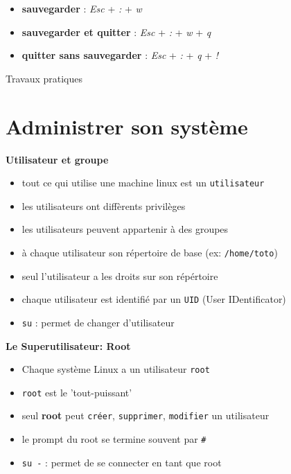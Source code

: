 \documentclass[french]{beamer}
\begin{document}
\begin{frame}
    \begin{itemize}
    \item \textbf{sauvegarder} : \textit{Esc} + \textit{:} + \textit{w} 
    \item \textbf{sauvegarder et quitter} : \textit{Esc} + \textit{:} +
    \textit{w} + \textit{q} 
    \item \textbf{quitter sans sauvegarder} : \textit{Esc} + \textit{:} +
    \textit{q} + \textit{!} 
    \end{itemize}
\end{frame}

\begin{frame}
\begin{center}
Travaux pratiques
\end{center}
\end{frame}

\section{Administrer son système}
\frame{\tableofcontents[current]}


\begin{frame}
\textbf{Utilisateur et groupe}
    \begin{itemize}
    \item tout ce qui utilise une machine linux est un \texttt{utilisateur}
    \item les utilisateurs ont diffèrents privilèges
    \item les utilisateurs peuvent appartenir à des groupes
    \item à chaque utilisateur son répertoire de base (ex: \texttt{/home/toto})
    \item seul l'utilisateur a les droits sur son répértoire
    \item chaque utilisateur est identifié par un \texttt{UID} (User IDentificator)
    \item \texttt{su} : permet de changer d'utilisateur
    \end{itemize}
\end{frame}

\begin{frame}
\textbf{Le Superutilisateur: Root}
    \begin{itemize}
    \item Chaque système Linux a un utilisateur \texttt{root}
    \item \texttt{root} est le 'tout-puissant'
    \item seul \textbf{root} peut \texttt{créer}, \texttt{supprimer},
    \texttt{modifier} un utilisateur
    \item le prompt du root se termine souvent par \texttt{\#}
    \item \texttt{su -} : permet de se connecter en tant que root
    \end{itemize}
\end{frame}
\end{document}
